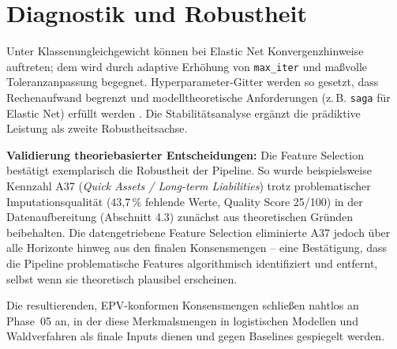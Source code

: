 \section{Diagnostik und Robustheit}
Unter Klassenungleichgewicht können bei Elastic Net Konvergenzhinweise auftreten; dem wird durch adaptive Erhöhung von \texttt{max\_iter} und maßvolle Toleranzanpassung begegnet. Hyperparameter-Gitter werden so gesetzt, dass Rechenaufwand begrenzt und modelltheoretische Anforderungen (z.\,B. \texttt{saga} für Elastic Net) erfüllt werden \parencite{hastieelementsstatistical2009}. Die Stabilitätsanalyse ergänzt die prädiktive Leistung als zweite Robustheitsachse.

\textbf{Validierung theoriebasierter Entscheidungen:} Die Feature Selection bestätigt exemplarisch die Robustheit der Pipeline. So wurde beispielsweise Kennzahl A37 (\textit{Quick Assets / Long-term Liabilities}) trotz problematischer Imputationsqualität (43,7\,\% fehlende Werte, Quality Score 25/100) in der Datenaufbereitung (Abschnitt 4.3) zunächst aus theoretischen Gründen beibehalten. Die datengetriebene Feature Selection eliminierte A37 jedoch über alle Horizonte hinweg aus den finalen Konsensmengen – eine Bestätigung, dass die Pipeline problematische Features algorithmisch identifiziert und entfernt, selbst wenn sie theoretisch plausibel erscheinen.

Die resultierenden, EPV-konformen Konsensmengen schließen nahtlos an Phase~05 an, in der diese Merkmalsmengen in logistischen Modellen und Waldverfahren als finale Inputs dienen und gegen Baselines gespiegelt werden.
